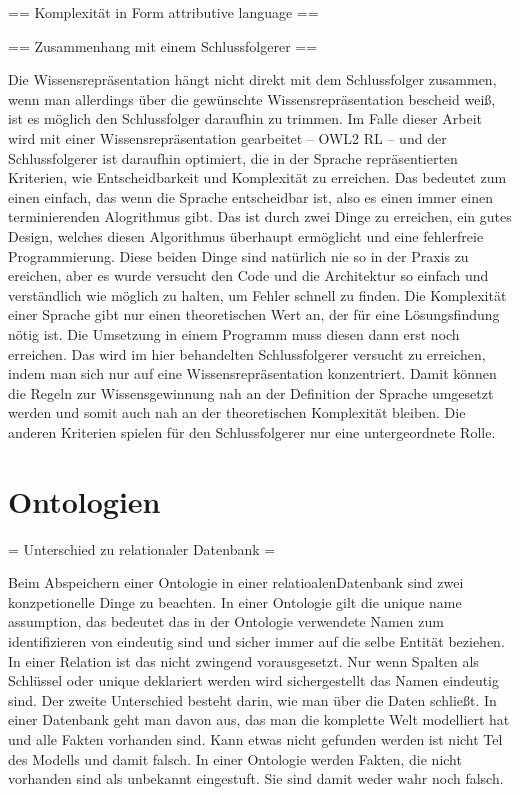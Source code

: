 == Komplexität in Form attributive language ==

== Zusammenhang mit einem Schlussfolgerer ==

Die Wissensrepräsentation hängt nicht direkt mit dem Schlussfolger zusammen, wenn man allerdings über die gewünschte Wissensrepräsentation bescheid weiß, ist es möglich den Schlussfolger daraufhin zu trimmen. Im Falle dieser Arbeit wird mit einer Wissensrepräsentation gearbeitet -- OWL2 RL -- und der Schlussfolgerer ist daraufhin optimiert, die in der Sprache repräsentierten Kriterien, wie Entscheidbarkeit und Komplexität zu erreichen.
Das bedeutet  zum einen einfach, das wenn die Sprache entscheidbar ist, also es einen immer einen terminierenden Alogrithmus gibt. Das ist durch zwei Dinge zu erreichen, ein gutes Design, welches diesen Algorithmus überhaupt ermöglicht und eine fehlerfreie Programmierung. Diese  beiden Dinge sind natürlich nie so in der Praxis zu ereichen, aber es wurde versucht den Code und die Architektur so einfach und verständlich wie möglich zu halten, um Fehler schnell zu finden.
Die Komplexität einer Sprache gibt nur einen theoretischen Wert an, der für eine Lösungsfindung nötig ist. Die Umsetzung in einem Programm muss diesen dann erst noch erreichen. Das wird im hier behandelten Schlussfolgerer versucht zu erreichen, indem man sich nur auf eine Wissensrepräsentation konzentriert. Damit können die Regeln zur Wissensgewinnung nah an der Definition der Sprache umgesetzt werden und somit auch nah an der theoretischen Komplexität bleiben.
Die anderen Kriterien spielen für den Schlussfolgerer nur eine untergeordnete Rolle.

\section{Ontologien}
= Unterschied zu relationaler Datenbank =

Beim Abspeichern einer Ontologie in einer relatioalenDatenbank sind zwei konzpetionelle Dinge zu beachten. In einer Ontologie gilt die unique name assumption, das bedeutet das in der Ontologie verwendete Namen zum identifizieren von  eindeutig sind und sicher immer auf die selbe Entität beziehen. In einer Relation ist das nicht zwingend vorausgesetzt. Nur wenn Spalten als Schlüssel oder unique deklariert werden wird sichergestellt das Namen eindeutig sind.
Der zweite Unterschied besteht darin, wie man über die Daten schließt. In einer Datenbank geht man davon aus, das man die komplette Welt modelliert hat und alle Fakten vorhanden sind. Kann etwas nicht gefunden werden ist nicht Tel des Modells und damit falsch. In einer Ontologie werden Fakten, die nicht vorhanden sind als unbekannt eingestuft. Sie sind damit weder wahr noch falsch.

